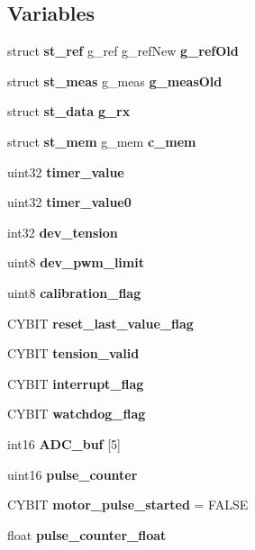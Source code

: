 \subsection*{Variables}
\begin{DoxyCompactItemize}
\item 
\mbox{\label{globals_8c_a158d26b6d15050b37d8039881d75e0dc}} 
struct \textbf{ st\+\_\+ref} g\+\_\+ref g\+\_\+ref\+New {\bfseries g\+\_\+ref\+Old}
\item 
\mbox{\label{globals_8c_a47c3980e6bddec492ca4315e36602ba0}} 
struct \textbf{ st\+\_\+meas} g\+\_\+meas {\bfseries g\+\_\+meas\+Old}
\item 
\mbox{\label{globals_8c_aa963ce8fafc11e104eb7ee22982d0345}} 
struct \textbf{ st\+\_\+data} {\bfseries g\+\_\+rx}
\item 
\mbox{\label{globals_8c_a44c3cbd8e234e0816f0334e29646a800}} 
struct \textbf{ st\+\_\+mem} g\+\_\+mem {\bfseries c\+\_\+mem}
\item 
\mbox{\label{globals_8c_ad47cd0e4d0fcf5739a88e52e949a8084}} 
uint32 {\bfseries timer\+\_\+value}
\item 
\mbox{\label{globals_8c_a9bab7f1b1cf2ba38d5968eee42644c32}} 
uint32 {\bfseries timer\+\_\+value0}
\item 
\mbox{\label{globals_8c_a53a494e9edc739a4f7c884778d1a93b1}} 
int32 {\bfseries dev\+\_\+tension}
\item 
\mbox{\label{globals_8c_a21f4f67e4203dea0b9956589eaa6cef3}} 
uint8 {\bfseries dev\+\_\+pwm\+\_\+limit}
\item 
\mbox{\label{globals_8c_afa36d7a54495dfdb796684539bf041a5}} 
uint8 {\bfseries calibration\+\_\+flag}
\item 
\mbox{\label{globals_8c_aa89a782cfe75ce7970236babd308fe69}} 
C\+Y\+B\+IT {\bfseries reset\+\_\+last\+\_\+value\+\_\+flag}
\item 
\mbox{\label{globals_8c_ac42fa606610c2600210d9b7b2c1d0882}} 
C\+Y\+B\+IT {\bfseries tension\+\_\+valid}
\item 
\mbox{\label{globals_8c_a1e6fda88dfdabc63859f8907eb702920}} 
C\+Y\+B\+IT {\bfseries interrupt\+\_\+flag}
\item 
\mbox{\label{globals_8c_a156a860c465529ff2f515725ab816a58}} 
C\+Y\+B\+IT {\bfseries watchdog\+\_\+flag}
\item 
\mbox{\label{globals_8c_ae87ec724f062d03e4f26473585e6a39f}} 
int16 {\bfseries A\+D\+C\+\_\+buf} [5]
\item 
\mbox{\label{globals_8c_adbb99439f0bdc2e7469e015d16b4d2c2}} 
uint16 {\bfseries pulse\+\_\+counter}
\item 
\mbox{\label{globals_8c_a9a9efe39376a01c0991cedc1a01c0540}} 
C\+Y\+B\+IT {\bfseries motor\+\_\+pulse\+\_\+started} = F\+A\+L\+SE
\item 
\mbox{\label{globals_8c_a0303b07a375125f93a5c178014ae0c6f}} 
float {\bfseries pulse\+\_\+counter\+\_\+float}
\end{DoxyCompactItemize}



